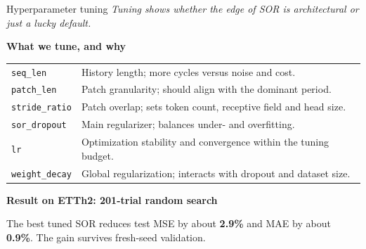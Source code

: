 \documentclass[aspectratio=169]{beamer}
\begin{document}
\begin{frame}{Hyperparameter tuning}
\small
\textit{Tuning shows whether the edge of SOR is architectural or just a lucky default.}\par
\vspace{0.5em}
{\setlength{\fboxsep}{7pt}\setlength{\fboxrule}{0.45pt}%
\noindent\color{black}}
\vspace{0.6em}

\textbf{What we tune, and why}\par\vspace{0.3em}
{\footnotesize
\renewcommand{\arraystretch}{1.12}
\begin{tabular}{@{}L{2.6cm} L{9.8cm}@{}}
  \texttt{seq\_len}      & History length; more cycles versus noise and cost. \\
  \texttt{patch\_len}    & Patch granularity; should align with the dominant period. \\
  \texttt{stride\_ratio} & Patch overlap; sets token count, receptive field and head size. \\
  \texttt{sor\_dropout}  & Main regularizer; balances under- and overfitting. \\
  \texttt{lr}            & Optimization stability and convergence within the tuning budget. \\
  \texttt{weight\_decay} & Global regularization; interacts with dropout and dataset size. \\
\end{tabular}}
\vspace{0.6em}

\textbf{Result on ETTh2: 201-trial random search}\par\vspace{0.3em}
{\small The best tuned SOR reduces test MSE by about \textbf{2.9\%} and MAE by about \textbf{0.9\%}. The gain survives fresh-seed validation.}
\end{frame}

\end{document}
